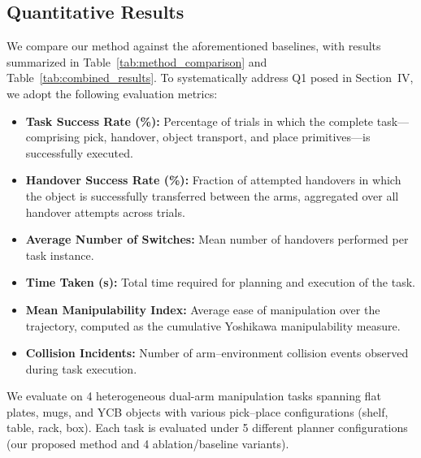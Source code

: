 
\subsection{Quantitative Results}

We compare our method against the aforementioned baselines, with results summarized in Table~\ref{tab:method_comparison} and Table~\ref{tab:combined_results}. To systematically address Q1 posed in Section~IV, we adopt the following evaluation metrics:

\begin{itemize}
\item \textbf{Task Success Rate (\%):} Percentage of trials in which the complete task---comprising pick, handover, object transport, and place primitives---is successfully executed.
\item \textbf{Handover Success Rate (\%):} Fraction of attempted handovers in which the object is successfully transferred between the arms, aggregated over all handover attempts across trials.
\item \textbf{Average Number of Switches:} Mean number of handovers performed per task instance.
\item \textbf{Time Taken (s):} Total time required for planning and execution of the task.
\item \textbf{Mean Manipulability Index:} Average ease of manipulation over the trajectory, computed as the cumulative Yoshikawa manipulability measure.
\item \textbf{Collision Incidents:} Number of arm--environment collision events observed during task execution.
\end{itemize}

We evaluate on 4 heterogeneous dual-arm manipulation tasks spanning flat plates, mugs, and YCB objects with various pick--place configurations (shelf, table, rack, box). Each task is evaluated under 5 different planner configurations (our proposed method and 4 ablation/baseline variants).

